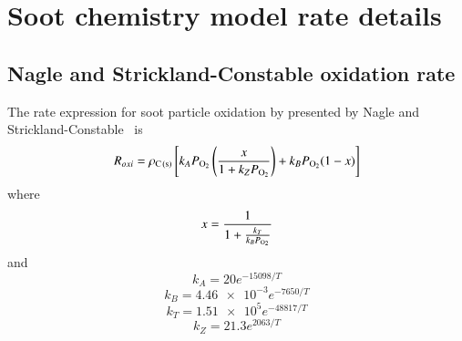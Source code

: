 \documentclass[preprint,letterpaper]{elsarticle}
\begin{document}

\appendix

\section{Soot chemistry model rate details}

\subsection{Nagle and Strickland-Constable oxidation rate}
\label{a:NSC}

The rate expression for soot particle oxidation by  presented by Nagle and Strickland-Constable~\cite{Nagle_1962} is
\begin{equation}
    R_{oxi} = \rho_{\ce{C(s)}} \left[ k_A P_{\ce{O2}} \left( \frac{x}{1+k_Z P_{\ce{O2}}}\right) + k_B P_{\ce{O2}} (1-x) \right]
\end{equation}
where
\begin{equation}
    x=\frac{1}{1+\frac{k_T}{k_B P_{\ce{O2}}}}
\end{equation}
and
\begin{equation}
    k_A = 20e^{-15098/T}
\end{equation}
\begin{equation}
    k_B = \num{4.46e-3}e^{-7650/T}
\end{equation}
\begin{equation}
    k_T = \num{1.51e5}e^{-48817/T}
\end{equation}
\begin{equation}
    k_Z = 21.3e^{2063/T}
\end{equation}
\end{document}
